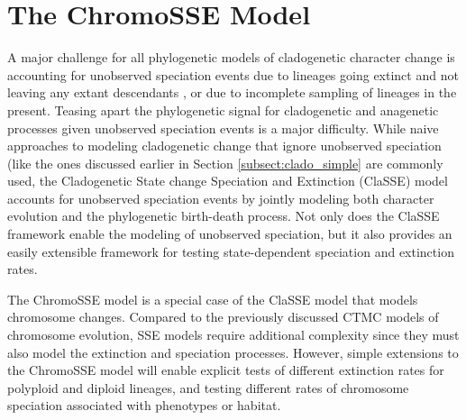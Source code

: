 \section{The ChromoSSE Model} \label{sec:chromosse_intro}


A major challenge for all phylogenetic models of cladogenetic character change
is accounting
for unobserved speciation events due to lineages going extinct
and not leaving any extant descendants \citep{bokma2002detection},
or due to incomplete sampling of lineages in the present.
Teasing apart
the phylogenetic signal for cladogenetic and anagenetic processes given
unobserved speciation events is a major difficulty.
While naive approaches to modeling cladogenetic change that ignore
unobserved speciation 
(like the ones discussed earlier in Section \ref{subsect:clado_simple} 
are commonly used,
the Cladogenetic State change Speciation and Extinction
(ClaSSE) model \citep{goldberg2012tempo}
accounts for unobserved speciation events
by jointly modeling both character evolution
and the phylogenetic birth-death process.
Not only does the ClaSSE framework enable the modeling of
unobserved speciation, but it also provides an easily extensible
framework for testing state-dependent speciation and extinction rates.

The ChromoSSE model \citep{freyman2016cladogenetic}
is a special case of the ClaSSE model that models chromosome
changes.
Compared to the previously discussed CTMC models of chromosome evolution,
SSE models require additional complexity since they must also
model the extinction and speciation processes.
However, simple extensions to the ChromoSSE model will enable explicit 
tests of different extinction rates for polyploid and diploid lineages,
and testing different rates of chromosome speciation associated with phenotypes or habitat.

